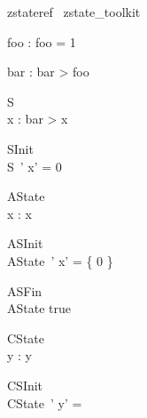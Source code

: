 \begin{zsection}	 \SECTION zstateref \parents~zstate\_toolkit
\end{zsection}

 

\begin{axdef}foo : \nat 
\where
 foo = 1
\end{axdef}

 

\begin{axdef}bar : \nat 
\where
 bar > foo
\end{axdef}

 


\begin{schema}{S}
\zstate\\
 x : \nat 
\where
 bar > x
\end{schema}

 

\begin{schema}{SInit}
\zstinit\\
 S~' 
\where
 x' = 0
\end{schema}

 

\begin{schema}{AState}
\zastate\\
 x : \power \nat 
\where
 x \neq \emptyset
\end{schema}

 

\begin{schema}{ASInit}
\zastinit\\
 AState~' 
\where
 x' = \{ 0 \}
\end{schema}

 

\begin{schema}{ASFin}
\zastfin\\
 AState 
\where
 true
\end{schema}

 

\begin{schema}{CState}
\zcstate\\
 y : \seq \nat 
\where
 y \neq \langle \rangle
\end{schema}

 

\begin{schema}{CSInit}
\zcstinit\\
 CState~' 
\where
 y' =~ \rangle
\end{schema}

